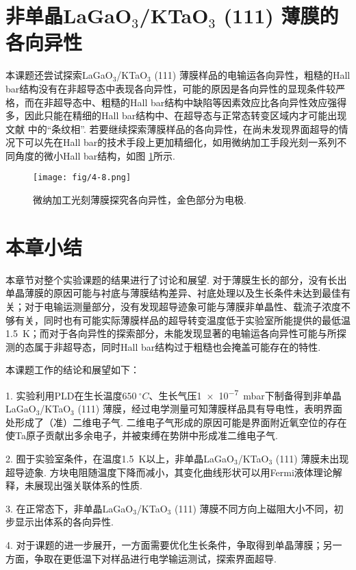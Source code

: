 \documentclass[12pt,a4paper,openany,twoside,UTF-8]{book}
\begin{document}
\section{非单晶LaGaO$_3$/KTaO$_3$ (111) 薄膜的各向异性}
本课题还尝试探索LaGaO$_3$/KTaO$_3$ (111) 薄膜样品的电输运各向异性，粗糙的Hall bar结构没有在非超导态中表现各向异性，可能的原因是各向异性的显现条件较严格，而在非超导态中、粗糙的Hall bar结构中缺陷等因素效应比各向异性效应强得多，因此只能在精细的Hall bar结构中、在超导态与正常态转变区域内才可能出现文献 \cite{ref22}中的“条纹相”.
若要继续探索薄膜样品的各向异性，在尚未发现界面超导的情况下可以先在Hall bar的技术手段上更加精细化，如用微纳加工手段光刻一系列不同角度的微小Hall bar结构，如图 \ref{fig:4-8}所示.

\begin{figure}[htbp]
\centering
\texttt{[image: fig/4-8.png]}
\caption{微纳加工光刻薄膜探究各向异性，金色部分为电极.}
\label{fig:4-8} 
\end{figure}

\section{本章小结}
本章节对整个实验课题的结果进行了讨论和展望. 对于薄膜生长的部分，没有长出单晶薄膜的原因可能与衬底与薄膜结构差异、衬底处理以及生长条件未达到最佳有关；对于电输运测量部分，没有发现超导迹象可能与薄膜非单晶性、载流子浓度不够有关，同时也有可能实际薄膜样品的超导转变温度低于实验室所能提供的最低温\SI{1.5}{K}；而对于各向异性的探索部分，未能发现显著的电输运各向异性可能与所探测的态属于非超导态，同时Hall bar结构过于粗糙也会掩盖可能存在的特性. 

本课题工作的结论和展望如下：

1. 实验利用PLD在生长温度$\SI{650}{^\circ C}$、生长气压\SI{1e-7}{mbar}下制备得到非单晶LaGaO$_3$/KTaO$_3$ (111) 薄膜，经过电学测量可知薄膜样品具有导电性，表明界面处形成了（准）二维电子气. 二维电子气形成的原因可能是界面附近氧空位的存在使Ta原子贡献出多余电子，并被束缚在势阱中形成准二维电子气.

2. 囿于实验室条件，在温度\SI{1.5}{K}以上，非单晶LaGaO$_3$/KTaO$_3$ (111) 薄膜未出现超导迹象. 方块电阻随温度下降而减小，其变化曲线形状可以用Fermi液体理论解释，未展现出强关联体系的性质.

3. 在正常态下，非单晶LaGaO$_3$/KTaO$_3$ (111) 薄膜不同方向上磁阻大小不同，初步显示出体系的各向异性.

4. 对于课题的进一步展开，一方面需要优化生长条件，争取得到单晶薄膜；另一方面，争取在更低温下对样品进行电学输运测试，探索界面超导.
\end{document}

